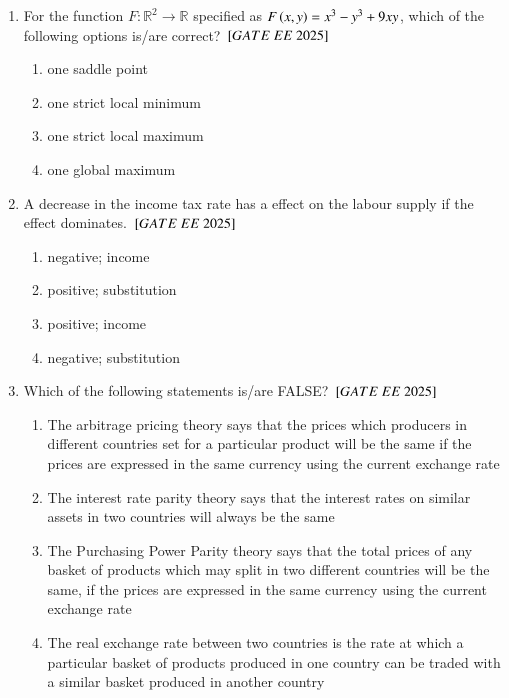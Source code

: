 \documentclass[journal,12pt,onecolumn]{IEEEtran}
\theoremstyle{remark}
\begin{document}
\begin{enumerate}
\item For the function $F: \mathbb{R}^2 \to \mathbb{R}$ specified as $F\left(x, y\right) = x^3 - y^3 + 9xy$, which of the following options is/are correct?
${}\left[GATE\ EE\ 2025\right]$\\
\begin{enumerate}[label=(\Alph*)]
\item one saddle point
\item one strict local minimum
\item one strict local maximum
\item one global maximum
\end{enumerate}
 
\item A decrease in the income tax rate has a \underline{\hspace{1cm}} effect on the labour supply if the \underline{\hspace{1cm}} effect dominates.
${}\left[GATE\ EE\ 2025\right]$\\
\begin{enumerate}[label=(\Alph*)]
\item negative; income
\item positive; substitution
\item positive; income
\item negative; substitution
\end{enumerate}
 
\item Which of the following statements is/are FALSE?
${}\left[GATE\ EE\ 2025\right]$\\
\begin{enumerate}[label=(\Alph*)]
\item The arbitrage pricing theory says that the prices which producers in different countries set for a particular product will be the same if the prices are expressed in the same currency using the current exchange rate
\item The interest rate parity theory says that the interest rates on similar assets in two countries will always be the same
\item The Purchasing Power Parity theory says that the total prices of any basket of products which may split in two different countries will be the same, if the prices are expressed in the same currency using the current exchange rate
\item The real exchange rate between two countries is the rate at which a particular basket of products produced in one country can be traded with a similar basket produced in another country
\end{enumerate}
 

\end{enumerate}
\end{document}
